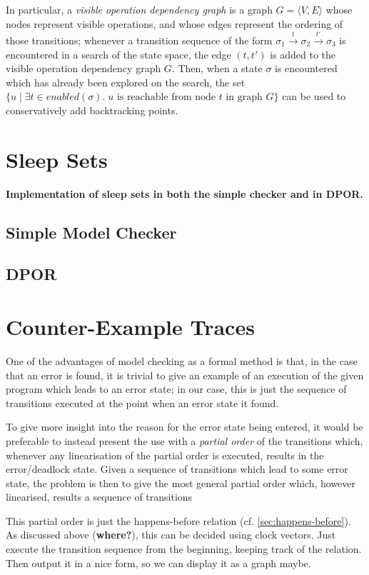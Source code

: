 \documentclass[12pt,a4paper,twoside,openright]{report}
\begin{document}
In particular, a \emph{visible operation dependency
graph} is a graph $G = \langle V, E \rangle$ whose
nodes represent visible operations, and whose edges
represent the ordering of those transitions; whenever
a transition sequence of the form
$\sigma_1 \xrightarrow{t} \sigma_2 \xrightarrow{t'}
 \sigma_3$
is encountered in a search of the state space, the
edge $(t, t')$ is added to the visible operation
dependency graph $G$. Then, when a state $\sigma$ is
encountered which has already been explored on the
search, the set
$\{u \mid \exists t \in \textit{enabled}(\sigma).\;
   u \text{ is reachable from node } t \text{ in graph } G\}$
can be used to conservatively add backtracking points.

\section{Sleep Sets}
\textbf{Implementation of sleep
	sets in both the simple checker
	and in DPOR.}
\subsection{Simple Model Checker}
\subsection{DPOR}

\section{Counter-Example Traces} \label{sec:traces}

One of the advantages of model checking as
a formal method is that, in the case that
an error is found, it is trivial to give
an example of an execution of the given
program which leads to an error state; in
our case, this is just the sequence of
transitions executed at the point when
an error state it found.

To give more insight into the reason for the
error state being entered, it would be preferable
to instead present the use with a
\emph{partial order} of the transitions which,
whenever any linearisation of the partial order
is executed, results in the error/deadlock state.
Given a sequence of transitions which lead to
some error state, the problem is
then to give the most general partial order
which, however linearised, results a sequence
of transitions 

This partial order is just the happens-before
relation (cf. \ref{sec:happens-before}). As
discussed above  (\textbf{where?}), this can
be decided using clock vectors.
Just execute the transition sequence
from the beginning, keeping track of the relation.
Then output it in a nice form, so we can display it
as a graph maybe.
\end{document}
